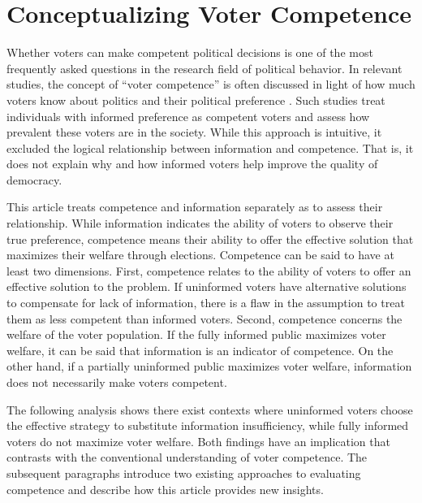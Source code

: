 \documentclass[doc,natbib,12pt]{apa6}
\begin{document}
	\section{Conceptualizing Voter Competence}
	
	\par Whether voters can make competent political decisions is one of the most frequently asked questions in the research field of political behavior. In relevant studies, the concept of ``voter competence'' is often discussed in light of how much voters know about politics and their political preference \citep{Converse1964thna, Dellicarpini1996wham, Goren2012onvo}. Such studies treat individuals with informed preference as competent voters and assess how prevalent these voters are in the society. While this approach is intuitive, it excluded the logical relationship between information and competence. That is, it does not explain why and how informed voters help improve the quality of democracy. 
	
	\par This article treats competence and information separately as to assess their relationship. While information indicates the ability of voters to observe their true preference, competence means their ability to offer the effective solution that maximizes their welfare through elections. Competence can be said to have at least two dimensions. 
	First, competence relates to the ability of voters to offer an effective solution to the problem. If uninformed voters have alternative solutions to compensate for lack of information, there is a flaw in the assumption to treat them as less competent than informed voters. Second, competence concerns the welfare of the voter population. If the fully informed public maximizes voter welfare, it can be said that information is an indicator of competence. On the other hand, if a partially uninformed public maximizes voter welfare, information does not necessarily make voters competent.
	
	\par The following analysis shows there exist contexts where uninformed voters choose the effective strategy to substitute information insufficiency, while fully informed voters do not maximize voter welfare. Both findings have an implication that contrasts with the conventional understanding of voter competence. The subsequent paragraphs introduce two existing approaches to evaluating competence and describe how this article provides new insights.
	
\end{document}
